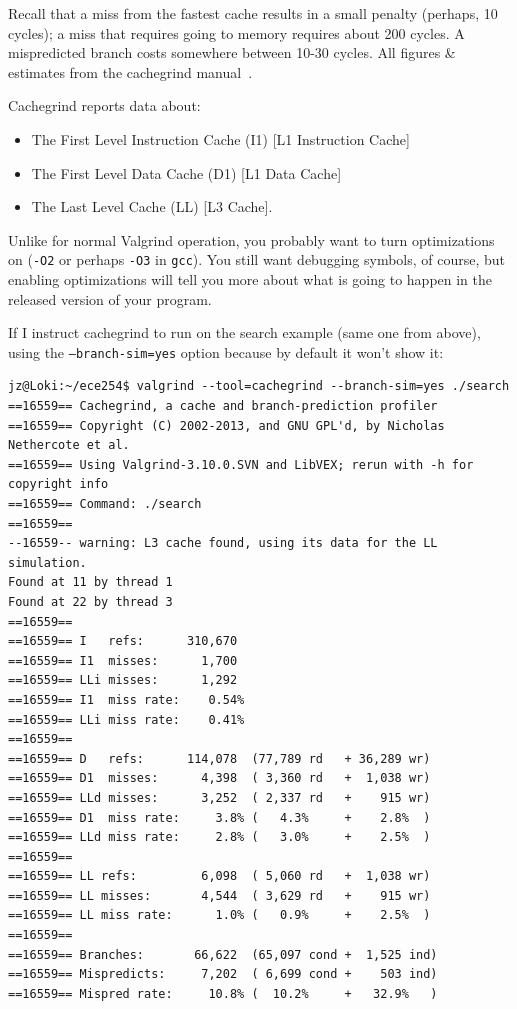 \documentclass[a4paper]{report}
\begin{document}
Recall that a miss from the fastest cache results in a small penalty (perhaps, 10 cycles); a miss that requires going to memory requires about 200 cycles. A mispredicted branch costs somewhere between 10-30 cycles. All figures \& estimates from the cachegrind manual~\cite{cachegrind}.

Cachegrind reports data about:
\begin{itemize}
	\item The First Level Instruction Cache (I1) [L1 Instruction Cache]
	\item The First Level Data Cache (D1) [L1 Data Cache]
	\item The Last Level Cache (LL) [L3 Cache].
\end{itemize}

Unlike for normal Valgrind operation, you probably want to turn optimizations on (\texttt{-O2} or perhaps \texttt{-O3} in \texttt{gcc}). You still want debugging symbols, of course, but enabling optimizations will tell you more about what is going to happen in the released version of your program.

If I instruct cachegrind to run on the search example (same one from above), using the \texttt{--branch-sim=yes} option because by default it won't show it:

\begin{verbatim}
jz@Loki:~/ece254$ valgrind --tool=cachegrind --branch-sim=yes ./search
==16559== Cachegrind, a cache and branch-prediction profiler
==16559== Copyright (C) 2002-2013, and GNU GPL'd, by Nicholas Nethercote et al.
==16559== Using Valgrind-3.10.0.SVN and LibVEX; rerun with -h for copyright info
==16559== Command: ./search
==16559== 
--16559-- warning: L3 cache found, using its data for the LL simulation.
Found at 11 by thread 1 
Found at 22 by thread 3 
==16559== 
==16559== I   refs:      310,670
==16559== I1  misses:      1,700
==16559== LLi misses:      1,292
==16559== I1  miss rate:    0.54%
==16559== LLi miss rate:    0.41%
==16559== 
==16559== D   refs:      114,078  (77,789 rd   + 36,289 wr)
==16559== D1  misses:      4,398  ( 3,360 rd   +  1,038 wr)
==16559== LLd misses:      3,252  ( 2,337 rd   +    915 wr)
==16559== D1  miss rate:     3.8% (   4.3%     +    2.8%  )
==16559== LLd miss rate:     2.8% (   3.0%     +    2.5%  )
==16559== 
==16559== LL refs:         6,098  ( 5,060 rd   +  1,038 wr)
==16559== LL misses:       4,544  ( 3,629 rd   +    915 wr)
==16559== LL miss rate:      1.0% (   0.9%     +    2.5%  )
==16559== 
==16559== Branches:       66,622  (65,097 cond +  1,525 ind)
==16559== Mispredicts:     7,202  ( 6,699 cond +    503 ind)
==16559== Mispred rate:     10.8% (  10.2%     +   32.9%   )

\end{verbatim}
\end{document}
